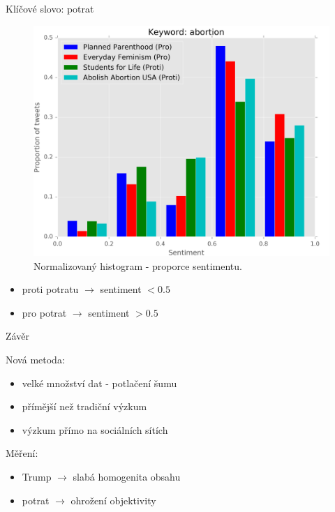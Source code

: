 \documentclass[notheorems,12pt]{beamer}
\begin{document}
\begin{frame}{Klíčové slovo: potrat}
    \begin{figure}
        \centering
        \includegraphics[scale=0.37]{./Pics/abortion-normed.png}
        \vspace{-0.2cm}
        \caption*{Normalizovaný histogram - proporce sentimentu.}
    \end{figure}
    \vspace{-0.4cm}
	\begin{itemize}
		\item proti potratu $\rightarrow$ sentiment $< 0.5$
        \item pro potrat $\rightarrow$ sentiment $> 0.5$
	\end{itemize}
\end{frame}
\begin{frame}{Závěr}
    \begin{block}{Nová metoda:}
        \begin{itemize}
            \item velké množství dat - potlačení šumu
            \item přímější než tradiční výzkum
            \item výzkum přímo na sociálních sítích
        \end{itemize}
    \end{block}

    \begin{block}{Měření:}
    	\begin{itemize}
            \item Trump $\rightarrow$ slabá homogenita obsahu
            \item potrat $\rightarrow$ ohrožení objektivity
    	\end{itemize}
    \end{block}
\end{frame}
\end{document}
